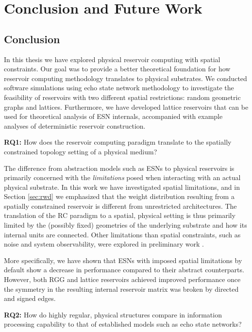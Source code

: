 \chapter{Conclusion and Future Work}
\label{ch:conclusion}

\section{Conclusion}

In this thesis we have explored physical reservoir computing with spatial
constraints. Our goal was to provide a better theoretical foundation for how
reservoir computing methodology translates to physical substrates. We conducted
software simulations using echo state network methodology to investigate the
feasibility of reservoirs with two different spatial restrictions: random
geometric graphs and lattices. Furthermore, we have developed lattice reservoirs
that can be used for theoretical analysis of ESN internals, accompanied with
example analyses of deterministic reservoir construction.

\textbf{RQ1:} How does the reservoir computing paradigm translate to the
spatially constrained topology setting of a physical medium?

The difference from abstraction models such as ESNs to physical reservoirs is
primarily concerned with the \textit{limitations} posed when interacting with an
actual physical substrate. In this work we have investigated spatial
limitations, and in Section \ref{sec:rwd} we emphasized that the weight
distribution resulting from a spatially constrained reservoir is different from
unrestricted architectures. The translation of the RC paradigm to a spatial,
physical setting is thus primarily limited by the (possibly fixed) geometries of
the underlying substrate and how its internal units are connected. Other
limitations than spatial constraints, such as noise and system observability,
were explored in preliminary work \cite{aven_exploring_2019}.

More specifically, we have shown that ESNs with imposed spatial limitations by
default show a decrease in performance compared to their abstract
counterparts. However, both RGG and lattice reservoirs achieved improved
performance once the symmetry in the resulting internal reservoir matrix was
broken by directed and signed edges.

\textbf{RQ2:} How do highly regular, physical structures compare in information
processing capability to that of established models such as echo state networks?

